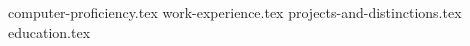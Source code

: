 \documentclass[11pt, a4paper]{awesome-cv}
\newcommand*{\sectiondir}{resume-manager/}
\begin{document}
\makecvheader

{computer-proficiency.tex}
{work-experience.tex}
{projects-and-distinctions.tex}
{education.tex}
\end{document}
